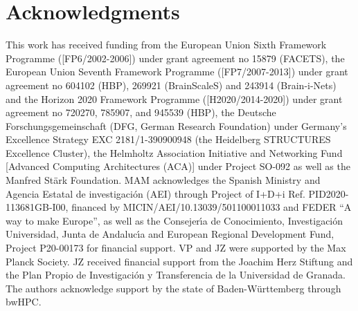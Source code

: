 \section*{Acknowledgments}

This work has received funding from the European Union Sixth Framework Programme ([FP6/2002-2006]) under grant agreement no 15879 (FACETS), the European Union Seventh Framework Programme ([FP7/2007-2013]) under grant agreement no 604102 (HBP), 269921 (BrainScaleS) and 243914 (Brain-i-Nets) and the Horizon 2020 Framework Programme ([H2020/2014-2020]) under grant agreement no 720270, 785907, and 945539 (HBP), the Deutsche Forschungsgemeinschaft (DFG, German Research Foundation) under Germany’s Excellence Strategy EXC 2181/1-390900948 (the Heidelberg STRUCTURES Excellence Cluster), the Helmholtz Association Initiative and Networking Fund [Advanced Computing Architectures (ACA)] under Project SO-092 as well as the Manfred St\"{a}rk Foundation.
MAM acknowledges the Spanish Ministry and Agencia Estatal de investigaci{\'o}n (AEI) through Project of I+D+i Ref. PID2020-113681GB-I00, financed by MICIN/AEI/10.13039/501100011033 and FEDER “A way to make Europe”, as well as the Consejer{\'\i}a de Conocimiento, Investigaci{\'o}n Universidad, Junta de Andaluc{\'\i}a and European Regional Development Fund, Project P20-00173 for financial support.
VP and JZ were supported by the Max Planck Society.
JZ received financial support from the Joachim Herz Stiftung and the Plan Propio de Investigaci\'on y Transferencia de la Universidad de Granada.
The authors acknowledge support by the state of Baden-W\"{u}rttemberg through bwHPC.
